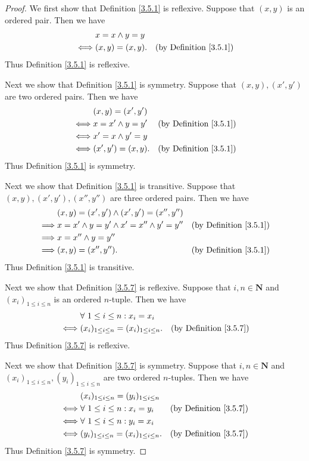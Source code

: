 \begin{proof}
We first show that Definition \ref{3.5.1} is reflexive.
Suppose that \((x, y)\) is an ordered pair.
Then we have
\begin{align*}
& x = x \land y = y \\
\iff & (x, y) = (x, y). & \text{(by Definition \ref{3.5.1})}
\end{align*}
Thus Definition \ref{3.5.1} is reflexive.

Next we show that Definition \ref{3.5.1} is symmetry.
Suppose that \((x, y), (x', y')\) are two ordered pairs.
Then we have
\begin{align*}
& (x, y) = (x', y') \\
\iff & x = x' \land y = y' & \text{(by Definition \ref{3.5.1})} \\
\iff & x' = x \land y' = y \\
\iff & (x', y') = (x, y). & \text{(by Definition \ref{3.5.1})}
\end{align*}
Thus Definition \ref{3.5.1} is symmetry.

Next we show that Definition \ref{3.5.1} is transitive.
Suppose that \((x, y), (x', y'), (x'', y'')\) are three ordered pairs.
Then we have
\begin{align*}
& (x, y) = (x', y') \land (x', y') = (x'', y'') \\
\implies & x = x' \land y = y' \land x' = x'' \land y' = y'' & \text{(by Definition \ref{3.5.1})} \\
\implies & x = x'' \land y = y'' \\
\implies & (x, y) = (x'', y''). & \text{(by Definition \ref{3.5.1})}
\end{align*}
Thus Definition \ref{3.5.1} is transitive.

Next we show that Definition \ref{3.5.7} is reflexive.
Suppose that \(i, n \in \mathbf{N}\) and \((x_i)_{1 \leq i \leq n}\) is an ordered \(n\)-tuple.
Then we have
\begin{align*}
& \forall\ 1 \leq i \leq n : x_i = x_i \\
\iff & (x_i)_{1 \leq i \leq n} = (x_i)_{1 \leq i \leq n}. & \text{(by Definition \ref{3.5.7})}
\end{align*}
Thus Definition \ref{3.5.7} is reflexive.

Next we show that Definition \ref{3.5.7} is symmetry.
Suppose that \(i, n \in \mathbf{N}\) and \((x_i)_{1 \leq i \leq n}, (y_i)_{1 \leq i \leq n}\) are two ordered \(n\)-tuples.
Then we have
\begin{align*}
& (x_i)_{1 \leq i \leq n} = (y_i)_{1 \leq i \leq n} \\
\iff & \forall\ 1 \leq i \leq n : x_i = y_i & \text{(by Definition \ref{3.5.7})} \\
\iff & \forall\ 1 \leq i \leq n : y_i = x_i \\
\iff & (y_i)_{1 \leq i \leq n} = (x_i)_{1 \leq i \leq n}. & \text{(by Definition \ref{3.5.7})}
\end{align*}
Thus Definition \ref{3.5.7} is symmetry.


\end{proof}
